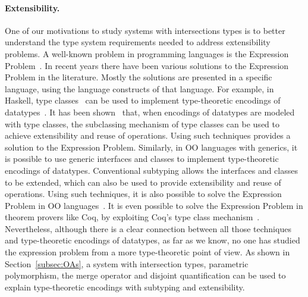 \paragraph{Extensibility.} One of our motivations to study systems
with intersections types is to better understand the
type system requirements needed to address extensibility problems.
A well-known problem in programming languages is the Expression
Problem~\cite{wadler1998expression}. In recent years there have been
various solutions to the Expression Problem in the literature. Mostly
the solutions are presented in a specific language, using the language
constructs of that language. For example, in Haskell, type classes~\cite{WadlerB89}
can be used to implement type-theoretic encodings of
datatypes~\cite{Hinze:2006}. It has been shown~\cite{finally-tagless}
that, when encodings of datatypes are modeled with type classes,
the subclassing mechanism of type classes can be used to achieve
extensibility and reuse of operations. Using such techniques provides
a solution to the Expression Problem. Similarly, in OO languages with
generics, it is possible to use generic interfaces and classes to
implement type-theoretic encodings of datatypes. Conventional
subtyping allows the interfaces and classes to be extended, which can
also be used to provide extensibility and reuse of operations. Using
such techniques, it is also possible to solve the Expression Problem
in OO languages~\cite{oliveira09modular,oliveira2012extensibility}.
It is even possible to solve the Expression Problem in theorem provers
like Coq, by exploiting Coq's type class mechanism~\cite{DelawareOS13}.
Nevertheless, although there is a clear connection between all those
techniques and type-theoretic encodings of datatypes, as far as we
know, no one has studied the expression problem from a more
type-theoretic point of view. As shown in Section~\ref{subsec:OAs}, a system
with intersection types, parametric polymorphism, the merge operator
and disjoint quantification can be used to explain type-theoretic
encodings with subtyping and extensibility.



